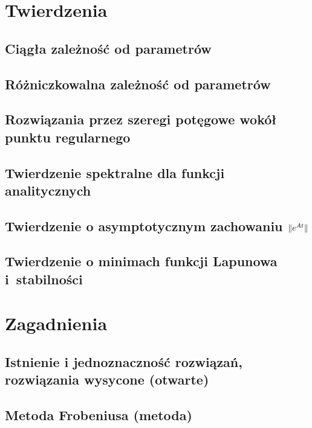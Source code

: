 



  \maketitle
  
  \tableofcontents
  
  \chapter{Twierdzenia}
    \section{Ciągła zależność od parametrów}
      
    \section{Różniczkowalna zależność od parametrów}
      
    \section{Rozwiązania przez szeregi potęgowe wokół punktu regularnego}
      
    \section{Twierdzenie spektralne dla funkcji analitycznych}
      
    \section{Twierdzenie o asymptotycznym zachowaniu $ \lVert e^{At}\rVert $}
      
    \section{Twierdzenie o minimach funkcji Lapunowa i~stabilności}
    
  \chapter{Zagadnienia}
    \section{Istnienie i jednoznaczność rozwiązań, rozwiązania wysycone (otwarte)}
      
    \section{Metoda Frobeniusa (metoda)}
      
